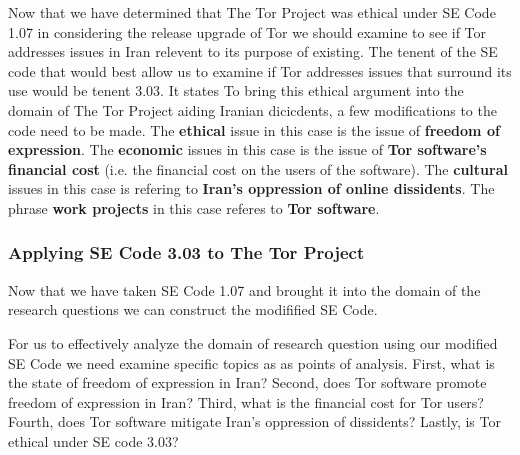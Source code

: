\documentclass[11pt]{article}
\begin{document}
\begin{multicols}{2}
Now that we have determined that The Tor Project was ethical under SE Code 1.07
in considering the release upgrade of Tor we should examine to see if Tor
addresses issues in Iran relevent to its purpose of existing. The tenent of the
SE code that would best allow us to examine if Tor addresses issues that
surround its use would be tenent 3.03.  It states
\newline
{}
\newline
To bring this ethical argument into the domain of The Tor Project aiding Iranian
dicicdents, a few modifications to the code need to be made. The
\textbf{ethical} issue in this case is the issue of \textbf{freedom of
expression}. The \textbf{economic} issues in this case is the issue of
\textbf{Tor software's financial cost} (i.e. the financial cost on the users of
the software). The \textbf{cultural} issues in this case is refering to
\textbf{Iran's oppression of online dissidents}. The phrase \textbf{work
projects} in this case referes to \textbf{Tor software}.

\subsubsection{Applying SE Code 3.03 to The Tor Project}

Now that we have taken SE Code 1.07 and brought it into the domain of the
research questions we can construct the modifified SE Code.

\begin{center}
\end{center}
\newline

For us to effectively analyze the domain of research question using our modified
SE Code we need examine specific topics as as points of analysis.  First, what
is the state of freedom of expression in Iran? Second, does Tor software
promote freedom of expression in Iran? Third, what is the financial cost for
Tor users?  Fourth, does Tor software mitigate Iran's oppression of dissidents?
Lastly, is Tor ethical under SE code 3.03?


\end{multicols}
\end{document}
